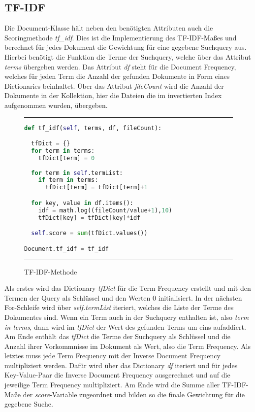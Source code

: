 \subsection{TF-IDF}\label{tf-idf}

Die Document-Klasse hält neben den benötigten Attributen auch die Scoringmethode \textit{tf\_idf}. Dies ist die Implementierung des TF-IDF-Maßes und berechnet für jedes Dokument die Gewichtung für eine gegebene Suchquery aus. Hierbei benötigt die Funktion die Terme der Suchquery, welche über das Attribut \textit{terms} übergeben werden. Das Attribut \textit{df} steht für die Document Frequency, welches für jeden Term die Anzahl der gefunden Dokumente in Form eines Dictionaries beinhaltet. Über das Attribut \textit{fileCount} wird die Anzahl der Dokumente in der Kollektion, hier die Dateien die im invertierten Index aufgenommen wurden, übergeben.\\

\begin{figure}[h]
	\rule{\textwidth}{0.4pt}
		\begin{lstlisting}[language=Python]
def tf_idf(self, terms, df, fileCount):

  tfDict = {}
  for term in terms:
    tfDict[term] = 0  
  
  for term in self.termList:
    if term in terms:
      tfDict[term] = tfDict[term]+1

  for key, value in df.items():
    idf = math.log((fileCount/value+1),10)
    tfDict[key] = tfDict[key]*idf

  self.score = sum(tfDict.values())

Document.tf_idf = tf_idf
		\end{lstlisting}
	\rule{\textwidth}{0.4pt}
	\caption{TF-IDF-Methode}
	\label{fig:tfidf}
\end{figure}

Als erstes wird das Dictionary \textit{tfDict} für die Term Frequency erstellt und mit den Termen der Query als Schlüssel und den Werten 0 initialisiert. In der nächsten For-Schleife wird über \textit{self.termList} iteriert, welches die Liste der Terme des Dokumentes sind. Wenn ein Term auch in der Suchquery enthalten ist, also \textit{term in terms}, dann wird im \textit{tfDict} der Wert des gefunden Terms um eins aufaddiert. Am Ende enthält das \textit{tfDict} die Terme der Suchquery als Schlüssel und die Anzahl ihrer Vorkommnisse im Dokument als Wert, also die Term Frequency. Als letztes muss jede Term Frequency mit der Inverse Document Frequency multipliziert werden. Dafür wird über das Dictionary \textit{df} iteriert und für jedes Key-Value-Paar die Inverse Document Frequency ausgerechnet und auf die jeweilige Term Frequency multipliziert. Am Ende wird die Summe aller TF-IDF-Maße der \textit{score}-Variable zugeordnet und bilden so die finale Gewichtung für die gegebene Suche.


